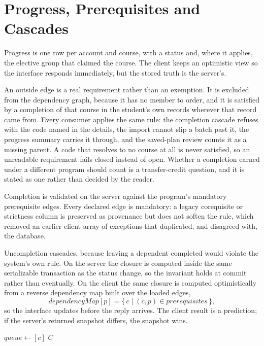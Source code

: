 \section{Progress, Prerequisites and Cascades}

Progress is one row per account and course, with a status and, where it applies, the elective group
that claimed the course. The client keeps an optimistic view so the interface responds immediately,
but the stored truth is the server's.

An outside edge is a real requirement rather than an exemption. It is excluded from the dependency
graph, because it has no member to order, and it is satisfied by a completion of that course in the
student's own records wherever that record came from. Every consumer applies the same rule: the
completion cascade refuses with the code named in the details, the import cannot slip a batch past
it, the progress summary carries it through, and the saved-plan review counts it as a missing parent.
A code that resolves to no course at all is never satisfied, so an unreadable requirement fails
closed instead of open. Whether a completion earned under a different program should count is a
transfer-credit question, and it is stated as one rather than decided by the reader.

Completion is validated on the server against the program's mandatory prerequisite edges. Every
declared edge is mandatory: a legacy corequisite or strictness column is preserved as provenance
but does not soften the rule, which removed an earlier client array of exceptions that duplicated,
and disagreed with, the database.

Uncompletion cascades, because leaving a dependent completed would violate the system's own rule. On
the server the closure is computed inside the same serializable transaction as the status change, so
the invariant holds at commit rather than eventually. On the client the same closure is computed
optimistically from a reverse dependency map built over the loaded edges,
\[
  \mathit{dependencyMap}[p] = \{\, c \mid (c, p) \in \mathit{prerequisites} \,\},
\]
so the interface updates before the reply arrives. The client result is a prediction; if the
server's returned snapshot differs, the snapshot wins.

\begin{algorithm}[H]
\caption{Optimistic dependent removal on the client}
$queue \leftarrow [c]$\;
\Return $C$\;
\end{algorithm}

